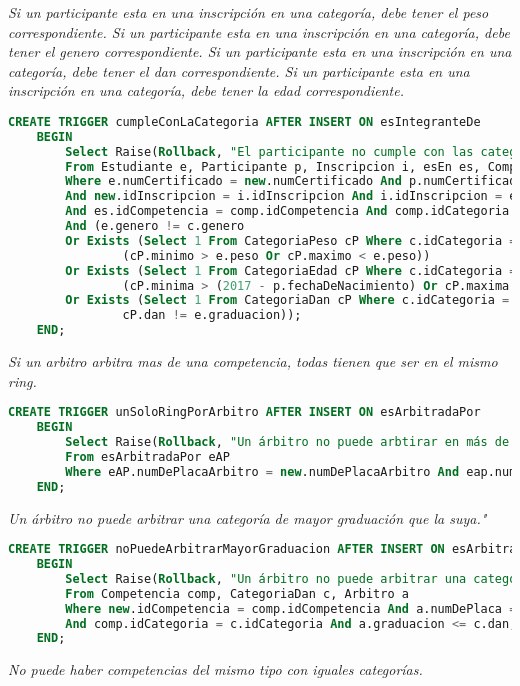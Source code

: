 \emph{
   Si un participante esta en una inscripción en una categoría, debe tener el peso correspondiente.
   Si un participante esta en una inscripción en una categoría, debe tener el genero correspondiente.
   Si un participante esta en una inscripción en una categoría, debe tener el dan correspondiente.
   Si un participante esta en una inscripción en una categoría, debe tener la edad correspondiente.
}

\begin{lstlisting}[language=SQL]
CREATE TRIGGER cumpleConLaCategoria AFTER INSERT ON esIntegranteDe
    BEGIN
        Select Raise(Rollback, "El participante no cumple con las categorías de la competencia.")
        From Estudiante e, Participante p, Inscripcion i, esEn es, Competencia comp, Categoria c
        Where e.numCertificado = new.numCertificado And p.numCertificado = new.numCertificado 
        And new.idInscripcion = i.idInscripcion And i.idInscripcion = es.idInscripcion 
        And es.idCompetencia = comp.idCompetencia And comp.idCategoria = c.idCategoria
        And (e.genero != c.genero
        Or Exists (Select 1 From CategoriaPeso cP Where c.idCategoria = cP.idCategoria And 
                (cP.minimo > e.peso Or cP.maximo < e.peso))
        Or Exists (Select 1 From CategoriaEdad cP Where c.idCategoria = cP.idCategoria And 
                (cP.minima > (2017 - p.fechaDeNacimiento) Or cP.maxima < (2017 - p.fechaDeNacimiento)))
        Or Exists (Select 1 From CategoriaDan cP Where c.idCategoria = cP.idCategoria And 
                cP.dan != e.graduacion));
    END;

\end{lstlisting}
\emph{
  Si un arbitro arbitra mas de una competencia, todas tienen que ser en el mismo ring.
}

\begin{lstlisting}[language=SQL]
CREATE TRIGGER unSoloRingPorArbitro AFTER INSERT ON esArbitradaPor
    BEGIN
        Select Raise(Rollback, "Un árbitro no puede arbtirar en más de un ring.")
        From esArbitradaPor eAP 
        Where eAP.numDePlacaArbitro = new.numDePlacaArbitro And eap.numeroDeRing != new.numeroDeRing;
    END;

\end{lstlisting}
\emph{
  Un árbitro no puede arbitrar una categoría de mayor graduación que la suya."
}

\begin{lstlisting}[language=SQL]
CREATE TRIGGER noPuedeArbitrarMayorGraduacion AFTER INSERT ON esArbitradaPor
    BEGIN
        Select Raise(Rollback, "Un árbitro no puede arbitrar una categoría de mayor graduación que la suya.")
        From Competencia comp, CategoriaDan c, Arbitro a
        Where new.idCompetencia = comp.idCompetencia And a.numDePlaca = new.numDePlacaArbitro 
        And comp.idCategoria = c.idCategoria And a.graduacion <= c.dan;
    END;


\end{lstlisting}
\emph{
  No puede haber competencias del mismo tipo con iguales categorías.
}

